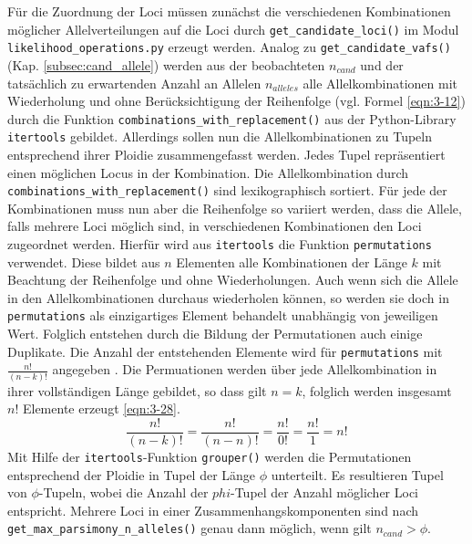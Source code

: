 Für die Zuordnung der Loci müssen zunächst die verschiedenen Kombinationen möglicher Allelverteilungen auf die Loci durch \lstinline|get_candidate_loci()| im Modul \linebreak \lstinline|likelihood_operations.py| erzeugt werden. Analog zu \lstinline|get_candidate_vafs()| (Kap. \ref{subsec:cand_allele}) werden aus der beobachteten $n_{cand} $ und der tatsächlich zu erwartenden Anzahl an Allelen $n_{alleles}$ alle Allelkombinationen mit Wiederholung und ohne Berücksichtigung der Reihenfolge  (vgl. Formel \eqref{eqn:3-12}) durch die Funktion \lstinline|combinations_with_replacement()| aus der Python-Library \lstinline|itertools| gebildet. Allerdings sollen nun die Allelkombinationen zu Tupeln entsprechend ihrer Ploidie zusammengefasst werden. Jedes Tupel repräsentiert einen möglichen Locus in der Kombination. Die Allelkombination durch \linebreak \lstinline|combinations_with_replacement()| sind lexikographisch sortiert. Für jede der Kombinationen muss nun aber die Reihenfolge so variiert werden, dass die Allele, falls mehrere Loci möglich sind, in verschiedenen Kombinationen den Loci zugeordnet werden. Hierfür wird aus \lstinline|itertools| die Funktion \lstinline|permutations| verwendet. Diese bildet aus $ n $ Elementen alle Kombinationen der Länge $ k $ mit Beachtung der Reihenfolge und ohne Wiederholungen. Auch wenn sich die Allele in den Allelkombinationen durchaus wiederholen können, so werden sie doch in \lstinline|permutations| als einzigartiges Element behandelt unabhängig von jeweiligen Wert. Folglich entstehen durch die Bildung der Permutationen auch einige Duplikate. Die Anzahl der entstehenden Elemente wird für \lstinline|permutations| mit  $ \frac{n!}{(n-k)!} $ angegeben \cite{itertools}. Die Permuationen werden über jede Allelkombination in ihrer vollständigen Länge gebildet, so dass gilt $ n = k $, folglich werden insgesamt $ n! $ Elemente erzeugt \eqref{eqn:3-28}. 
\begin{equation} \label{eqn:3-28}
\tag{3-28}
\frac{n!}{(n-k)!}=\frac{n!}{(n-n)!}=\frac{n!}{0!}=\frac{n!}{1}=n!
\end{equation}
Mit Hilfe der \lstinline|itertools|-Funktion \lstinline|grouper()| werden die Permutationen entsprechend der Ploidie in Tupel der Länge $\phi$ unterteilt. Es resultieren Tupel von $ \phi $-Tupeln, wobei die Anzahl der $phi$-Tupel der Anzahl möglicher Loci entspricht. Mehrere Loci in einer Zusammenhangskomponenten sind nach \lstinline|get_max_parsimony_n_alleles()| genau dann möglich, wenn gilt $n_{cand} > \phi $.\\


